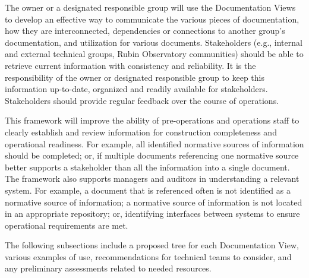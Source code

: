 The owner or a designated responsible group will use the Documentation Views to develop an effective way to communicate the various pieces of documentation, how they are interconnected, dependencies or connections to another group's documentation, and utilization for various documents.
Stakeholders (e.g., internal and external technical groups, Rubin Observatory communities) should be able to retrieve current information with consistency and reliability.
It is the responsibility of the owner or designated responsible group to keep this information up-to-date, organized and readily available for stakeholders.
Stakeholders should provide regular feedback over the course of operations.

This framework will improve the ability of pre-operations and operations staff to clearly establish and review information for construction completeness and operational readiness.
For example, all identified normative sources of information should be completed; or, if multiple documents referencing one normative source better supports a stakeholder than all the information into a single document.
The framework also supports managers and auditors in understanding a relevant system.
For example, a document that is referenced often is not identified as a normative source of information; a normative source of information is not located in an appropriate repository; or, identifying interfaces between systems to ensure operational requirements are met.

The following subsections include a proposed tree for each Documentation View, various examples of use, recommendations for technical teams to consider, and any preliminary assessments related to needed resources.





